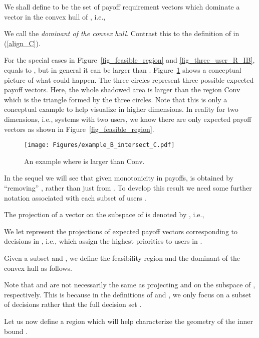 \documentclass[prodmode,acmtompecs]{acmsmall}
\newcommand{\myComments}[1]{}
\newif\ifdissertation
\newcommand{\dissertationStart}{\ifdissertation  \myComments{Dissertation version: }}
\newcommand{\commentEnd}{\myComments{End}}
\begin{document}
We shall define  to be the set of payoff requirement vectors  which dominate a vector in the convex hull of , i.e., 

We call  the {\em dominant of the convex hull}. Contrast this to the definition of  in (\ref{align_C}). 

For the special cases in Figure~{\ref{fig_feasible_region}} and \ref{fig_three_user_R_IB},  equals to , but in general it can be larger than . Figure~{\ref{fig_eg_for_B_intersect_C}} shows a conceptual picture of what could happen. The three circles represent three possible expected payoff vectors. Here, the whole shadowed area  is larger than the region Conv which is the triangle formed by the three circles. 
Note that this is only a conceptual example to help visualize  in higher dimensions. In reality for two dimensions, i.e., systems with two users, we know there are only  expected payoff vectors as shown in Figure~{\ref{fig_feasible_region}}. 

\begin{figure}[htp]
  \centering
  \texttt{[image: Figures/example\_B\_intersect\_C.pdf]}
  \caption{An example where  is larger than Conv. }
  \label{fig_eg_for_B_intersect_C}
\end{figure} 

In the sequel we will see that given monotonicity in payoffs,  is obtained by ``removing'' , rather than just  from . 
To develop this result we need some further notation associated with each subset of users . 

The projection of a vector  on the subspace of  is denoted by , i.e., 




We let  represent the projections of expected payoff vectors corresponding to decisions in , i.e., which assign the highest priorities to users in . 

Given a subset  and , we define the feasibility region  and the dominant of the convex hull  as follows. 



Note that  and  are not necessarily the same as projecting  and  on the subspace of , respectively. This is because in the definitions of  and , 
we only focus on a subset of decisions  rather that the full decision set . 
\dissertationStart
we only focus on priority decisions  rather that the full decision set . 
\commentEnd\fi

Let us now define a region  which will help characterize the geometry of the inner bound . 
\end{document}
